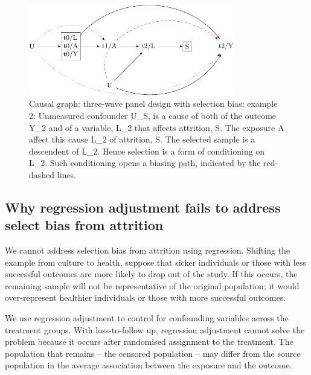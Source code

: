 \documentclass[
  singlecolumn]{report}
\begin{document}
\begin{figure}

{\centering \includegraphics[width=0.8\textwidth,height=\textheight]{causal-dags_files/figure-pdf/fig-dag-8-2-1.pdf}

}

\caption{\label{fig-dag-8-2}Causal graph: three-wave panel design with
selection bias: example 2: Unmeasured confounder U\_S, is a cause of
both of the outcome Y\_2 and of a variable, L\_2 that affects attrition,
S. The exposure A affect this cause L\_2 of attrition, S. The selected
sample is a descendent of L\_2. Hence selection is a form of
conditioning on L\_2. Such conditioning opens a biasing path, indicated
by the red-dashed lines.}

\end{figure}

\hypertarget{why-regression-adjustment-fails-to-address-select-bias-from-attrition}{%
\subsection{Why regression adjustment fails to address select bias from
attrition}\label{why-regression-adjustment-fails-to-address-select-bias-from-attrition}}

We cannot address selection bias from attrition using regression.
Shifting the example from culture to health, suppose that sicker
individuals or those with less successful outcomes are more likely to
drop out of the study. If this occurs, the remaining sample will not be
representative of the original population; it would over-represent
healthier individuals or those with more successful outcomes.

We use regression adjustment to control for confounding variables across
the treatment groups. With loss-to-follow up, regression adjustment
cannot solve the problem because it occurs after randomised assignment
to the treatment. The population that remains -- the censored population
-- may differ from the source population in the average association
between the exposure and the outcome.
\end{document}
